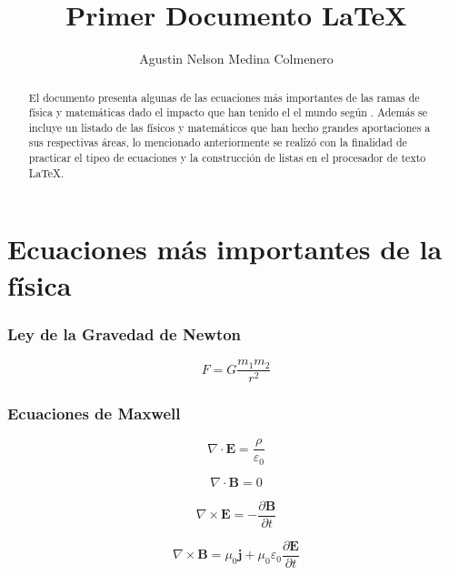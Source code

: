 \documentclass[10pt,a4paper]{article}
\author{Agustin Nelson Medina Colmenero}
\title{Primer Documento \LaTeX}
\begin{document}
\maketitle

\begin{abstract}
El documento presenta algunas de las ecuaciones más importantes de las ramas de física y matemáticas dado el impacto que han tenido el el mundo según \cite{Ec}.
Además se incluye un listado de las físicos y matemáticos que han hecho grandes aportaciones a sus respectivas áreas, lo mencionado anteriormente se realizó con la finalidad de practicar el tipeo de ecuaciones y la construcción de listas en el procesador de texto \LaTeX . 
\end{abstract}



\section*{Ecuaciones más importantes de la física}

\subsubsection*{Ley de la Gravedad de Newton}
\begin{equation}
F = G \frac{m_1 m_2}{r^2}
\end{equation}


\subsubsection*{Ecuaciones de Maxwell}
\begin{equation}
\nabla \cdot \textbf{E} = \frac{\rho}{\varepsilon_0} 
\end{equation}

\begin{equation}
\nabla \cdot \textbf{B} = 0 
\end{equation}

\begin{equation}
\nabla \times \textbf{E} = - \frac{\partial \textbf{B}}{\partial t}
\end{equation}

\begin{equation}
\nabla \times \textbf{B} =
 \mu_0 \textbf{j} +\mu_0 \varepsilon _0 \frac{\partial \textbf{E}}{\partial t}
\end{equation}
\end{document}
